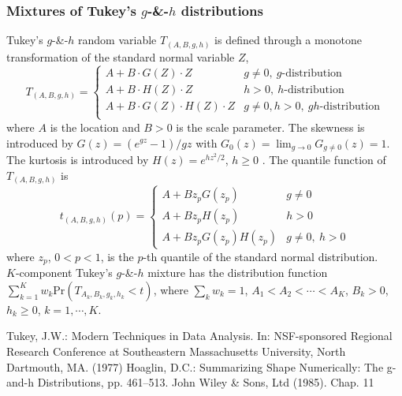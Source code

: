 \documentclass[t,8pt]{beamer}
\begin{document}
\frame
   {\frametitle{Mixtures of Tukey's $g$-\&-$h$ distributions }  

Tukey's $g$-\&-$h$ random variable $T_{(A,B,g,h)}$ \cite{Tukey77} is defined through a monotone transformation of the standard normal variable $Z$,
\begin{equation*}
T_{(A,B,g,h)} =
\begin{cases}
A + B\cdot G(Z)\cdot Z & g\neq 0,\ g\text{-distribution} \\
A + B\cdot H(Z)\cdot Z & h>0,\ h\text{-distribution} \\
A + B\cdot G(Z)\cdot H(Z)\cdot Z & g\neq 0,h>0,\ gh\text{-distribution} \\
\end{cases}
\end{equation*}
where $A$ is the location and $B>0$ is the scale parameter.
The skewness is introduced by $G(z)=(e^{gz}-1)/gz$ with $G_0(z)=\lim_{g\rightarrow 0} G_{g \ne 0}(z)=1$.
The kurtosis is introduced by $H(z)=e^{hz^2/2}$, $h\ge 0$  \cite{Hoaglin85}.
The quantile function of $T_{(A,B,g,h)}$ is %
\begin{equation}
t_{(A, B, g, h)}(p)=
\begin{cases}
A+B z_p G(z_p) & g\neq0 \\
A+B z_p H(z_p) & h>0 \\
A+B z_p G(z_p) H(z_p) & g\neq 0,\ h>0 
\end{cases}
\label{eq:z2qGH}
\end{equation}
where $z_p$, $0<p<1$, is the $p$-th quantile of the standard normal distribution.\\
\color{red}
\bigskip
$K$-component Tukey's $g$-\&-$h$ mixture has the distribution function $ \sum^K_{k=1} w_k\text{Pr}\left(T_{A_k,B_k,g_k,h_k}<t\right)$,
where $\sum_k w_k = 1$, $A_1 < A_2 < \cdots < A_K$, $B_k>0$, $h_k\geq 0$, $k = 1,\cdots,K$.
	
\begin{thebibliography}{ }	
\begin{footnotesize}
Tukey, J.W.: Modern Techniques in Data Analysis. In: NSF-sponsored Regional Research Conference at Southeastern Massachusetts University, North Dartmouth, MA. (1977)
Hoaglin, D.C.: Summarizing Shape Numerically: The g-and-h Distributions, pp. 461–513. John Wiley & Sons, Ltd (1985). Chap. 11
\end{footnotesize}
\end{thebibliography}	
}
\end{document}
